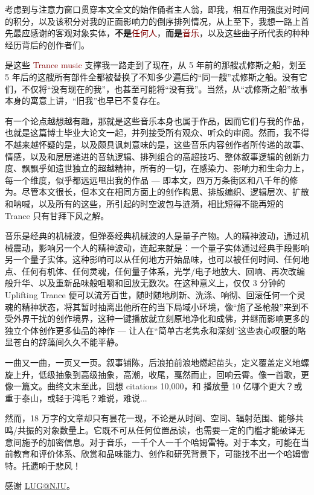 \documentclass[
    type = doctor,
  ]{njuthesis}
\begin{document}
\begin{acknowledgement}
  考虑到与注意力窗口贯穿本文全文的始作俑者主人翁，即我，相互作用强度对时间的积分，以及该积分对我的正面影响力的倒序排列情况，从上至下，我想一路上首先最应感谢的客观对象实体，\textbf{不是}\textcolor{Maroon}{任何人}，\textbf{而是}\textcolor{Maroon}{音乐}，以及这些曲子所代表的种种经历背后的创作者们。
  
  是这些 \textcolor{Maroon}{Trance music} 支撑我一路走到了现在，从 5 年前的那艘忒修斯之船，划至 5 年后的这艘所有部件全都被替换了不知多少遍后的“同一艘”忒修斯之船。没有它们，不仅将“没有现在的我”，也甚至可能将“没有我”。当然，从“忒修斯之船”故事本身的寓意上讲，“旧我”也早已不复存在。
  
  有一个论点越想越有趣，那就是这些音乐本身也属于作品，因而它们与我的作品，也就是这篇博士毕业大论文一起，并列接受所有观众、听众的审阅。然而，我不得不越来越怀疑的是，以及颇具讽刺意味的是，这些音乐内容创作者所传递的故事、情感，以及和层层递进的音轨逻辑、排列组合的高超技巧、整体叙事逻辑的创新力度、飘飘乎如遗世独立的超越精神，所有的一切，在感染力、影响力和生命力上，每一个维度，似乎都远远甩出我的作品 --- 即本文，四万万条街区和八千年的修为。尽管本文很长，但本文在相同方面上的创作构思、排版编织、逻辑层次、扩散和呐喊，以及所有的这些，所引起的时空波包与涟漪，相比短得不能再短的 Trance 只有甘拜下风之解。
  
  音乐是经典的机械波，但弹奏经典机械波的人是量子产物。人的精神波动，通过机械震动，影响另一个人的精神波动，连起来就是：一个量子实体通过经典手段影响另一个量子实体。这种影响可以从任何地方开始品味，也可以被任何时间、任何地点、任何有机体、任何灵魂，任何量子体系，光学/电子地放大、回响、再次改编般升华、以及重新品味般咀嚼和回放无数次。在这种意义上，仅仅 3 分钟的 Uplifting Trance 便可以流芳百世，随时随地刷新、洗涤、响彻、回滚任何一个灵魂的精神状态，将其暂时抽离出他所在的当下局域小环境，像“施了圣枪般”来到不受外界干扰的创作境界，这种一键播放就立刻原地净化和成佛，并继而影响更多的独立个体创作更多仙品的神作 --- 让人在“简单古老隽永和深刻”这些衷心叹服的略显苍白的辞藻间久久不能平静。
  
  一曲又一曲，一页又一页。叙事铺陈，后浪拍前浪地燃起苗头，定义覆盖定义地螺旋上升，低级抽象到高级抽象，高潮，收尾，戛然而止，回响云霄。像一首歌，更像一篇文。曲终文末至此，回想 citations 10,000，和 播放量 10 亿哪个更大？或重于泰山，或轻于鸿毛？难说，难说...
  
  然而，18 万字的文章却只有昙花一现，不论是从时间、空间、辐射范围、能够共鸣/共振的对象数量上。它既不可从任何位置品读，也需要一定的门槛才能破译无意间施予的加密信息。对于音乐，一千个人一千个哈姆雷特。对于本文，可能在当前教育和评价体系、欣赏和品味能力、创作和研究背景下，可能找不出一个哈姆雷特。托遗响于悲风！
  
  
  感谢 \href{https://git.nju.edu.cn/nju-lug/lug-introduction}{LUG@NJU}。
\end{acknowledgement}
\end{document}
